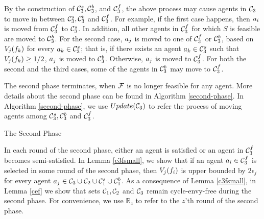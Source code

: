 \begin{itemize}
By the construction of $\mathcal{C}_3^s,\mathcal{C}_3^b$, and $\mathcal{C}_3^f$, the above process may cause agents in $\mathcal{C}_3$ to move in between $\mathcal{C}_3^s,\mathcal{C}_3^b$ and $\mathcal{C}_3^f$. For example, if the first case happens, then $a_i$ is moved from $\mathcal{C}_3^f$ to $\mathcal{C}_3^s$. In addition, all other agents in $\mathcal{C}_3^f$ for which $S$ is feasible are moved to $\mathcal{C}_3^b$. For the second case, $a_j$ is moved to one of $\mathcal{C}_3^f$ or $\mathcal{C}_3^b$, based on $V_j(f_k)$ for every $a_k \in \mathcal{C}_3^s$; that is, if there exists an agent $a_k \in \mathcal{C}_3^s$ such that $V_j(f_k) \geq 1/2$, $a_j$ is moved to $\mathcal{C}_3^b$. Otherwise, $a_j$ is moved to $\mathcal{C}_3^f$. For both the second and the third cases, some of the agents in $\mathcal{C}_3^b$ may move to $\mathcal{C}_3^f$. 
\end{itemize}
The second phase terminates, when $\mathcal{F}$ is no longer feasible for any agent. More details about the second phase can be found in Algorithm \ref{second-phase}.  In Algorithm \ref{second-phase}, we use $Update(\mathcal{C}_3)$ to refer the process of moving agents among $\mathcal{C}_3^s, \mathcal{C}_3^b$ and $\mathcal{C}_3^f$.
 

\begin{algorithm}[t!]
 \KwData{$\fitems, \cone,\ctwo,\cthree$}
 \caption{The Second Phase}
 \label{second-phase}
\end{algorithm}

In each round of the second phase, either an agent is satisfied or an agent in $\mathcal{C}_3^f$ becomes semi-satisfied. In Lemma \ref{c3fsmall}, we show that if an agent $a_i \in \mathcal{C}_3^f$ is selected in some round of the second phase, then $V_j(f_i)$ is upper bounded by $2\epsilon_j$ for every agent $a_j \in \mathcal{C}_3 \cup \mathcal{C}_2 \cup \mathcal{C}_1^s \cup \mathcal{C}_1^b$. As a consequence of Lemma \ref{c3fsmall}, in Lemma \ref{cef} we show that sets $\mathcal{C}_1,\mathcal{C}_2$ and $\mathcal{C}_3$ remain cycle-envy-free during the second phase. For convenience, we use $\mathbb{R}_z$ to refer to the $z$'th round of the second phase. 

